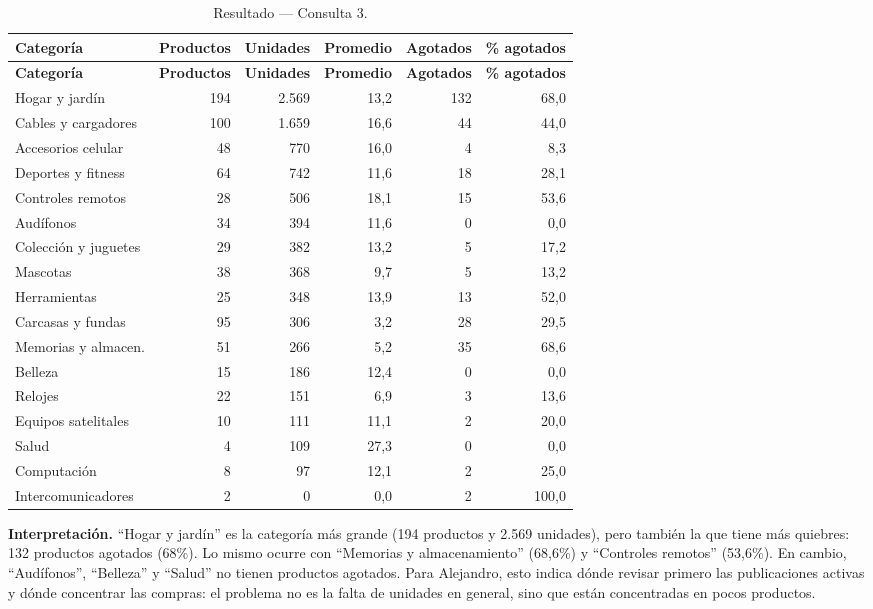 \documentclass[11pt,letterpaper]{article}
\renewcommand{\_}{\oldus\allowbreak}
\begin{document}
\begin{small}
\begin{longtable}{lrrrrr}
\caption{Resultado — Consulta 3.}\\
\toprule
\textbf{Categoría} & \textbf{Productos} & \textbf{Unidades} & \textbf{Promedio} & \textbf{Agotados} & \textbf{\% agotados} \\
\midrule
\endfirsthead
\toprule
\textbf{Categoría} & \textbf{Productos} & \textbf{Unidades} & \textbf{Promedio} & \textbf{Agotados} & \textbf{\% agotados} \\
\midrule
\endhead
\bottomrule
\endfoot
Hogar y jardín & 194 & 2.569 & 13,2 & 132 & 68,0 \\
Cables y cargadores & 100 & 1.659 & 16,6 & 44 & 44,0 \\
Accesorios celular & 48 & 770 & 16,0 & 4 & 8,3 \\
Deportes y fitness & 64 & 742 & 11,6 & 18 & 28,1 \\
Controles remotos & 28 & 506 & 18,1 & 15 & 53,6 \\
Audífonos & 34 & 394 & 11,6 & 0 & 0,0 \\
Colección y juguetes & 29 & 382 & 13,2 & 5 & 17,2 \\
Mascotas & 38 & 368 & 9,7 & 5 & 13,2 \\
Herramientas & 25 & 348 & 13,9 & 13 & 52,0 \\
Carcasas y fundas & 95 & 306 & 3,2 & 28 & 29,5 \\
Memorias y almacen. & 51 & 266 & 5,2 & 35 & 68,6 \\
Belleza & 15 & 186 & 12,4 & 0 & 0,0 \\
Relojes & 22 & 151 & 6,9 & 3 & 13,6 \\
Equipos satelitales & 10 & 111 & 11,1 & 2 & 20,0 \\
Salud & 4 & 109 & 27,3 & 0 & 0,0 \\
Computación & 8 & 97 & 12,1 & 2 & 25,0 \\
Intercomunicadores & 2 & 0 & 0,0 & 2 & 100,0 \\
\end{longtable}
\end{small}

\textbf{Interpretación.} “Hogar y jardín” es la categoría más grande (194 productos y 2.569 unidades), pero también la que tiene más quiebres: 132 productos agotados (68\%). Lo mismo ocurre con “Memorias y almacenamiento” (68,6\%) y “Controles remotos” (53,6\%). En cambio, “Audífonos”, “Belleza” y “Salud” no tienen productos agotados. Para Alejandro, esto indica dónde revisar primero las publicaciones activas y dónde concentrar las compras: el problema no es la falta de unidades en general, sino que están concentradas en pocos productos.
\end{document}
